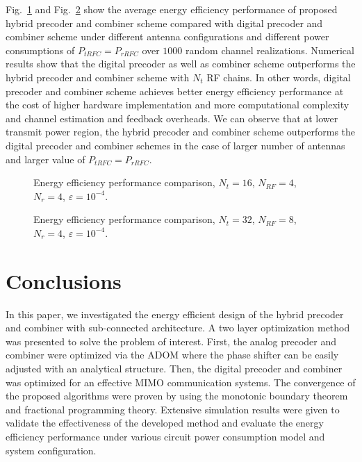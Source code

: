 \documentclass[11pt,draftcls,onecolumn]{IEEEtran}
\begin{document}
Fig.~\ref{EnergyEfficiencyComparison1} and Fig.~\ref{EnergyEfficiencyComparison2} show the average energy efficiency performance of proposed hybrid precoder and combiner scheme compared with digital precoder and combiner scheme under different antenna configurations and different power consumptions of  $P_{tRFC}=P_{rRFC}$ over $1000$ random channel realizations. Numerical results show that the digital precoder as well as combiner scheme outperforms the hybrid precoder and combiner scheme with $N_{t}$ RF chains. In other words, digital precoder and combiner scheme achieves better energy efficiency performance at the cost of higher hardware implementation and more computational complexity and channel estimation and feedback overheads. We can observe that at lower transmit power region, the hybrid precoder and combiner scheme outperforms the digital precoder and combiner schemes in the case of larger number of antennas and larger value of $P_{tRFC}=P_{rRFC}$.
\begin{figure}
\centering
{}
\onelinecaptionstrue
{}
\caption{Energy efficiency performance comparison, $N_{t}=16$, $N_{RF}=4$, $N_{r}=4$, $\varepsilon=10^{-4}$.}
\label{EnergyEfficiencyComparison1}
\end{figure}


\begin{figure}
\centering
{}
\onelinecaptionstrue
{}
\caption{Energy efficiency performance comparison, $N_{t}=32$, $N_{RF}=8$, $N_{r}=4$, $\varepsilon=10^{-4}$.}
\label{EnergyEfficiencyComparison2}
\end{figure}

\section{Conclusions}

In this paper, we investigated the energy efficient design of the hybrid precoder and combiner with sub-connected architecture. A two layer optimization method was presented to solve the problem of interest. First, the analog precoder and combiner were optimized via the ADOM where the phase shifter can be easily adjusted with an analytical structure. Then, the digital precoder and combiner was optimized for an effective MIMO communication systems. The convergence of the proposed algorithms were proven by using the monotonic boundary theorem and fractional programming theory. Extensive simulation results were given to validate the effectiveness of the developed method and evaluate the energy efficiency performance under various circuit power consumption model and system configuration.
\end{document}
